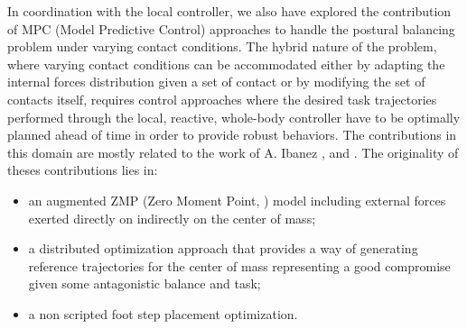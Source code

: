 \documentclass[final,5p,twocolumn]{elsarticle}
\begin{document}
In coordination with the local controller, we also have explored the contribution of MPC (Model Predictive Control) approaches to handle the postural balancing problem under varying contact conditions. The hybrid nature of the problem, where varying contact conditions can be accommodated either by adapting the internal forces distribution given a set of contact or by modifying the set of contacts itself, requires control approaches where the desired task trajectories performed through the local, reactive, whole-body controller have to be optimally planned ahead of time in order to provide robust behaviors. The contributions in this domain are mostly related to the work of A. Ibanez \cite{ibanez2013}, \cite{ibanez2014-icra} and \cite{ibanez2014-ark}. The originality of theses contributions lies in:
\begin{itemize}
	\item an augmented ZMP (Zero Moment Point, \cite{vukobratovic2004zero}) model including external forces exerted directly on indirectly on the center of mass;
	\item a distributed optimization approach that provides a way of generating reference trajectories for the center of mass representing a good compromise given some antagonistic balance and task;
	\item a non scripted foot step placement optimization.
\end{itemize}
\end{document}
